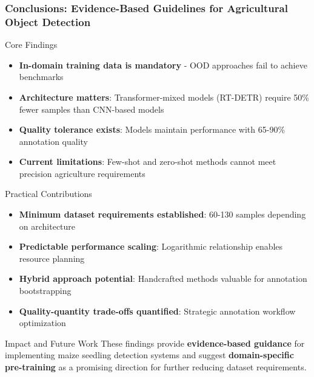 \documentclass[aspectratio=43]{beamer}
\begin{document}
\begin{frame}
    \frametitle{Conclusions: Evidence-Based Guidelines for Agricultural Object Detection}
    
    \begin{exampleblock}{Core Findings}
        \begin{itemize}
            \item \textbf{In-domain training data is mandatory} - OOD approaches fail to achieve benchmarks
            \item \textbf{Architecture matters}: Transformer-mixed models (RT-DETR) require 50\% fewer samples than CNN-based models
            \item \textbf{Quality tolerance exists}: Models maintain performance with 65-90\% annotation quality
            \item \textbf{Current limitations}: Few-shot and zero-shot methods cannot meet precision agriculture requirements
        \end{itemize}
    \end{exampleblock}
    
    \begin{block}{Practical Contributions}
        \begin{itemize}
            \item \textbf{Minimum dataset requirements established}: 60-130 samples depending on architecture
            \item \textbf{Predictable performance scaling}: Logarithmic relationship enables resource planning
            \item \textbf{Hybrid approach potential}: Handcrafted methods valuable for annotation bootstrapping
            \item \textbf{Quality-quantity trade-offs quantified}: Strategic annotation workflow optimization
        \end{itemize}
    \end{block}
    
    \begin{alertblock}{Impact and Future Work}
        These findings provide \textbf{evidence-based guidance} for implementing maize seedling detection systems and suggest \textbf{domain-specific pre-training} as a promising direction for further reducing dataset requirements.
    \end{alertblock}
\end{frame}
\end{document}
